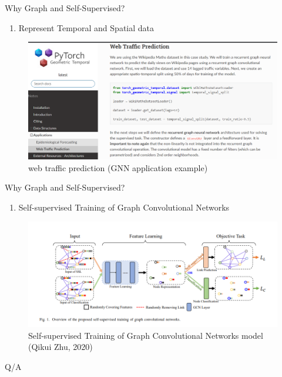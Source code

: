 \documentclass{beamer}
\newcounter{saveenumi}
\newcommand{\seti}{\setcounter{saveenumi}{\value{enumi}}}
\newcommand{\conti}{\setcounter{enumi}{\value{saveenumi}}}
\begin{document}
	\begin{frame}[t]{Why Graph and Self-Supervised?}
		\begin{enumerate}
			\conti
			\item Represent Temporal and Spatial data
			\seti
		\end{enumerate}
	\begin{figure}
		\includegraphics[scale=0.3]{web.png}
		\caption{web traffic prediction (GNN application example)}
	\end{figure}
	\end{frame}

	\begin{frame}[t]{Why Graph and Self-Supervised?}
		\begin{enumerate}
			\conti
			\item Self-supervised Training of Graph Convolutional Networks

		\end{enumerate}
		\begin{figure}
			\includegraphics[scale=0.4]{self_graph.png}
			\caption{Self-supervised Training of Graph Convolutional Networks model (Qikui Zhu, 2020)}
		\end{figure}
	\end{frame}

	\begin{frame}[standout]
		Q/A
	\end{frame}
\end{document}
